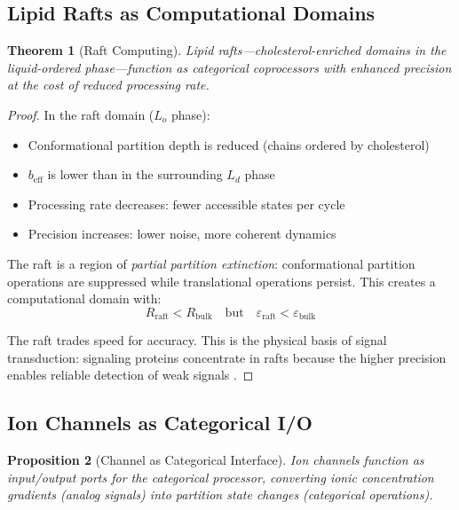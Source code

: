 \documentclass[twocolumn,10pt]{article}
\newtheorem{theorem}{Theorem}[section]
\newtheorem{proposition}[theorem]{Proposition}
\theoremstyle{remark}
\newcommand{\eps}{\varepsilon}
\begin{document}
\subsection{Lipid Rafts as Computational Domains}

\begin{theorem}[Raft Computing]
\label{thm:raft_computing}
Lipid rafts---cholesterol-enriched domains in the liquid-ordered phase---function as \emph{categorical coprocessors} with enhanced precision at the cost of reduced processing rate.
\end{theorem}

\begin{proof}
In the raft domain ($L_o$ phase):
\begin{itemize}
    \item Conformational partition depth is reduced (chains ordered by cholesterol)
    \item $b_{\text{eff}}$ is lower than in the surrounding $L_d$ phase
    \item Processing rate decreases: fewer accessible states per cycle
    \item Precision increases: lower noise, more coherent dynamics
\end{itemize}

The raft is a region of \emph{partial partition extinction}: conformational partition operations are suppressed while translational operations persist. This creates a computational domain with:
\begin{equation}
    R_{\text{raft}} < R_{\text{bulk}} \quad \text{but} \quad \eps_{\text{raft}} < \eps_{\text{bulk}}
\end{equation}

The raft trades speed for accuracy. This is the physical basis of signal transduction: signaling proteins concentrate in rafts because the higher precision enables reliable detection of weak signals \cite{simons1997,pike2006}.
\end{proof}

\subsection{Ion Channels as Categorical I/O}

\begin{proposition}[Channel as Categorical Interface]
\label{prop:channel_io}
Ion channels function as input/output ports for the categorical processor, converting ionic concentration gradients (analog signals) into partition state changes (categorical operations).
\end{proposition}
\end{document}
